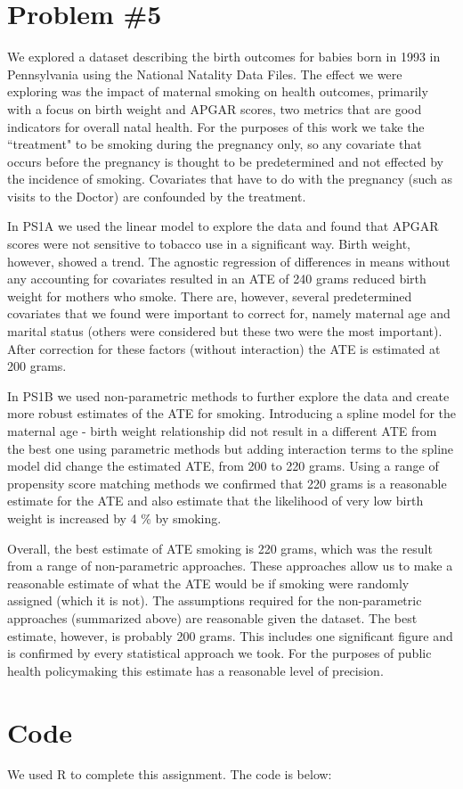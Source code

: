\documentclass[letterpaper, 12pt]{article}
\begin{document}
\section{Problem \#5}
We explored a dataset describing the birth outcomes for babies born in 1993 in Pennsylvania using the National Natality Data Files.  The effect we were exploring was the impact of maternal smoking on health outcomes, primarily with a focus on birth weight and APGAR scores, two metrics that are good indicators for overall natal health.  For the purposes of this work we take the ``treatment" to be smoking during the pregnancy only, so any covariate that occurs before the pregnancy is thought to be predetermined and not effected by the incidence of smoking.  Covariates that have to do with the pregnancy (such as visits to the Doctor) are confounded by the treatment.  

In PS1A we used the linear model to explore the data and found that APGAR scores were not sensitive to tobacco use in a significant way.  Birth weight, however, showed a trend.  The agnostic regression of differences in means without any accounting for covariates resulted in an ATE of 240 grams reduced birth weight for mothers who smoke.  There are, however, several predetermined covariates that we found were important to correct for, namely maternal age and marital status (others were considered but these two were the most important).  After correction for these factors (without interaction) the ATE is estimated at 200 grams.  

In PS1B we used non-parametric methods to further explore the data and create more robust estimates of the ATE for smoking.  Introducing a spline model for the maternal age - birth weight relationship did not result in a different ATE from the best one using parametric methods but adding interaction terms to the spline model did change the estimated ATE, from 200 to 220 grams.  Using a range of propensity score matching methods we confirmed that 220 grams is a reasonable estimate for the ATE and also estimate that the likelihood of very low birth weight is increased by 4 \% by smoking.  

Overall, the best estimate of ATE smoking is 220 grams, which was the result from a range of non-parametric approaches.  These approaches allow us to make a reasonable estimate of what the ATE would be if smoking were randomly assigned (which it is not).  The assumptions required for the non-parametric approaches (summarized above) are reasonable given the dataset.  The best estimate, however, is probably 200 grams.  This includes one significant figure and is confirmed by every statistical approach we took.  For the purposes of public health policymaking this estimate has a reasonable level of precision.

\section{Code}
We used R to complete this assignment.  The code is below:




\newpage
\thispagestyle{empty}
\mbox{}
\end{document}
